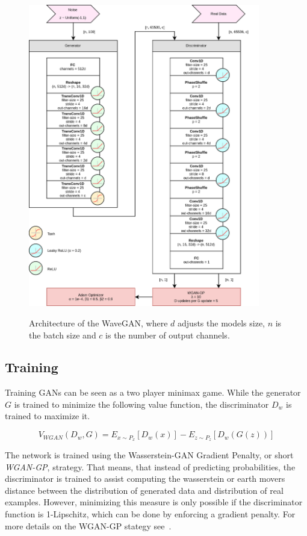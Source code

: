 \documentclass[12pt]{article}
\begin{document}
\begin{figure}
\includegraphics[width=0.9\textwidth]{img/wavegan-arch.png}
\label{fig:WaveGan-arch}
\caption{Architecture of the WaveGAN, where $d$ adjusts the models size, $n$ is the batch size and $c$ is the number of output channels.}%
\end{figure}

\subsection{Training}

Training GANs can be seen as a two player minimax game. 
While the generator $G$ is trained to minimize the following value function, the discriminator
$D_w$ is trained to maximize it.

$$
V_{WGAN}(D_w, G) = E_{x \sim P_x}[D_w(x)] - E_{z \sim P_z}[D_w(G(z))]
$$

The network is trained using the Wasserstein-GAN Gradient Penalty, or short \emph{WGAN-GP}, strategy.
That means, that instead of predicting probabilities, the discriminator is trained to assist computing the wasserstein or
earth movers distance between the distribution of generated data and distribution of real examples.
However, minimizing this measure is only possible if the discriminator function is 1-Lipschitz, which can be done by enforcing a gradient penalty.
For more details on the WGAN-GP stategy see~\cite{gulrajani2017improved}.
\end{document}
